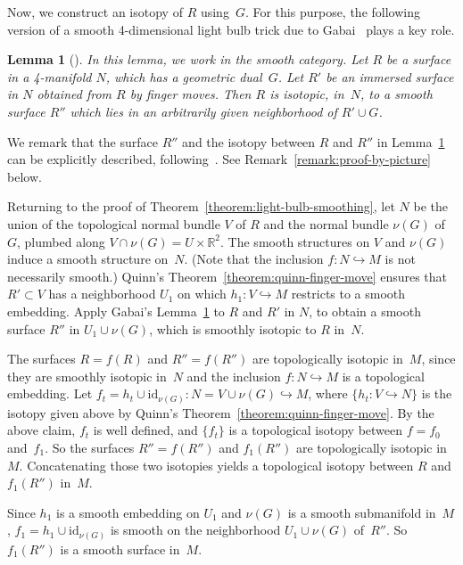 \documentclass[11pt]{amsart}
\newtheorem{lemma}[theorem]{Lemma}
\theoremstyle{definition}
\theoremstyle{theorem-giventitle}
\theoremstyle{definition-giventitle}
\numberwithin{equation}{section}
\def\R{\mathbb{R}}
\def\id{\mathrm{id}}
\begin{document}
Now, we construct an isotopy of $R$ using~$G$.
For this purpose, the following version of a smooth 4-dimensional light bulb trick due to Gabai~\cite{Gabai:2020-1} plays a key role.


\begin{lemma}[{\cite[Lemma~5.1]{Gabai:2020-1}}]
  \label{lemma:gabai-light-bulb-trick}
  In this lemma, we work in the smooth category.
  Let $R$ be a surface in a 4-manifold $N$, which has a geometric dual~$G$.
  Let $R'$ be an immersed surface in $N$ obtained from $R$ by finger moves.
  Then $R$ is isotopic, in~$N$, to a smooth surface $R''$ which lies in an arbitrarily given neighborhood of $R'\cup G$.
\end{lemma}

We remark that the surface $R''$ and the isotopy between $R$ and $R''$ in Lemma~\ref{lemma:gabai-light-bulb-trick} can be explicitly described, following~\cite[Proof of Lemma~5.1]{Gabai:2020-1}.
See Remark~\ref{remark:proof-by-picture} below. 

Returning to the proof of Theorem~\ref{theorem:light-bulb-smoothing}, let $N$ be the union of the topological normal bundle $V$ of $R$ and the normal bundle $\nu(G)$ of $G$, plumbed along $V\cap \nu(G) = U\times \R^2$.
The smooth structures on $V$ and $\nu(G)$ induce a smooth structure on~$N$.
(Note that the inclusion $f\colon N \hookrightarrow M$ is not necessarily smooth.)
Quinn's Theorem~\ref{theorem:quinn-finger-move} ensures that $R'\subset V$ has a neighborhood $U_1$ on which $h_1\colon V\hookrightarrow M$ restricts to a smooth embedding.
Apply Gabai's Lemma~\ref{lemma:gabai-light-bulb-trick} to $R$ and $R'$ in $N$, to obtain a smooth surface $R''$ in 
$U_1\cup \nu(G)$, which is smoothly isotopic to $R$ in~$N$.

The surfaces $R=f(R)$ and $R''=f(R'')$ are topologically isotopic in~$M$, since they are smoothly isotopic in~$N$ and the inclusion $f\colon N\hookrightarrow M$ is a topological embedding.
Let $f_t = h_t \cup \id_{\nu(G)}\colon N = V\cup \nu(G) \hookrightarrow M$, where $\{h_t\colon V\hookrightarrow N\}$ is the isotopy given above by Quinn's Theorem~\ref{theorem:quinn-finger-move}.
By the above claim, $f_t$ is well defined, and $\{f_t\}$ is a topological isotopy between $f=f_0$ and~$f_1$.
So the surfaces $R''=f(R'')$ and $f_1(R'')$ are topologically isotopic in~$M$.
Concatenating those two isotopies yields a topological isotopy between $R$ and $f_1(R'')$ in~$M$.

Since $h_1$ is a smooth embedding on $U_1$ and $\nu(G)$ is a smooth submanifold in~$M$, $f_1=h_1\cup \id_{\nu(G)}$ is smooth on the neighborhood $U_1\cup \nu(G)$ of~$R''$.
So $f_1(R'')$ is a smooth surface in~$M$.
\end{document}
